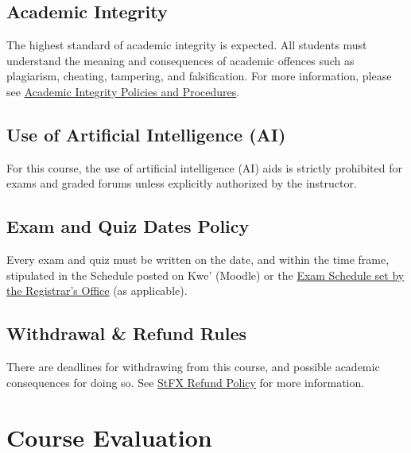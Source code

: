 \documentclass[12pt]{article}
\begin{document}
\subsection*{Academic Integrity}

The highest standard of academic integrity is expected. All students must understand the meaning and consequences of academic offences such as plagiarism, cheating, tampering, and falsification. For more information, please see \href{https://www.stfx.ca/student-services/academic-services/academic-success-centre/academic-integrity}{Academic Integrity Policies and Procedures}.

\subsection*{Use of Artificial Intelligence (AI)}

For this course, the use of artificial intelligence (AI) aids is strictly prohibited for exams and graded forums unless explicitly authorized by the instructor.

\subsection*{Exam and Quiz Dates Policy}

Every exam and quiz must be written on the date, and within the time frame, stipulated in the Schedule posted on Kwe’ (Moodle) or the \href{https://www.stfx.ca/applications-admissions/registrars-office/examinations}{Exam Schedule set by the Registrar’s Office} (as applicable).

\subsection*{Withdrawal \& Refund Rules}

There are deadlines for withdrawing from this course, and possible academic consequences for doing so. See \href{https://drive.google.com/file/d/1PyNFH_oOmuxQtN2hc7oxZXAcQaHOnOAJ/view}{StFX Refund Policy} for more information.

\section*{Course Evaluation}
\end{document}
